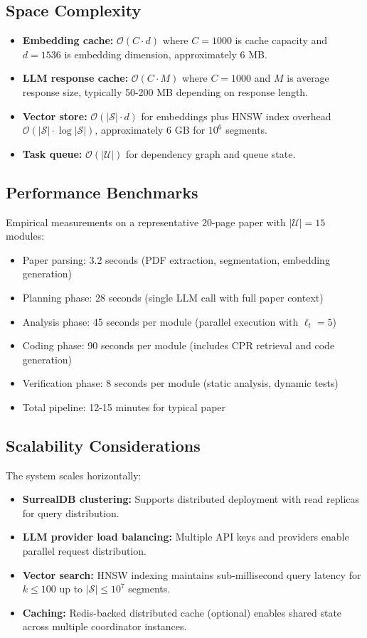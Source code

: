 \documentclass{ieeeaccess}
\begin{document}
\subsection{Space Complexity}
\begin{itemize}
\item \textbf{Embedding cache:} \(\mathcal{O}(C \cdot d)\) where \(C=1000\) is cache capacity and \(d=1536\) is embedding dimension, approximately 6 MB.
\item \textbf{LLM response cache:} \(\mathcal{O}(C \cdot M)\) where \(C=1000\) and \(M\) is average response size, typically 50-200 MB depending on response length.
\item \textbf{Vector store:} \(\mathcal{O}(|\mathcal{S}| \cdot d)\) for embeddings plus HNSW index overhead \(\mathcal{O}(|\mathcal{S}| \cdot \log |\mathcal{S}|)\), approximately 6 GB for \(10^6\) segments.
\item \textbf{Task queue:} \(\mathcal{O}(|\mathcal{U}|)\) for dependency graph and queue state.
\end{itemize}

\subsection{Performance Benchmarks}
Empirical measurements on a representative 20-page paper with \(|\mathcal{U}|=15\) modules:
\begin{itemize}
\item Paper parsing: 3.2 seconds (PDF extraction, segmentation, embedding generation)
\item Planning phase: 28 seconds (single LLM call with full paper context)
\item Analysis phase: 45 seconds per module (parallel execution with \(\ell_t=5\))
\item Coding phase: 90 seconds per module (includes CPR retrieval and code generation)
\item Verification phase: 8 seconds per module (static analysis, dynamic tests)
\item Total pipeline: 12-15 minutes for typical paper
\end{itemize}

\subsection{Scalability Considerations}
The system scales horizontally:
\begin{itemize}
\item \textbf{SurrealDB clustering:} Supports distributed deployment with read replicas for query distribution.
\item \textbf{LLM provider load balancing:} Multiple API keys and providers enable parallel request distribution.
\item \textbf{Vector search:} HNSW indexing maintains sub-millisecond query latency for \(k \leq 100\) up to \(|\mathcal{S}| \leq 10^7\) segments.
\item \textbf{Caching:} Redis-backed distributed cache (optional) enables shared state across multiple coordinator instances.
\end{itemize}
\end{document}
